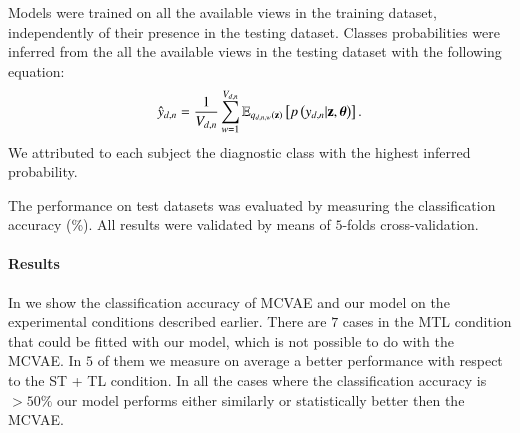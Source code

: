 Models were trained on all the available views in the training dataset, independently of their presence in the testing dataset.
Classes probabilities were inferred from the all the available views in the testing dataset with the following equation:
\begin{equation}\label{eq:reconstructiony}
\begin{aligned}
\hat{y}_{d,n} = \frac{1}{V_{d, n}} \sum_{w=1}^{V_{d, n}} \operatorname{\mathbb{E}}_{q_{d,n,w}(\mathbf{z})}\left[p\left(y_{d,n}|\mathbf{z},\boldsymbol{\theta}\right)\right].
\end{aligned}
\end{equation}
We attributed to each subject the diagnostic class with the highest inferred probability.

The performance on test datasets was evaluated by measuring the classification accuracy (\%).
All results were validated by means of $5$-folds cross-validation.

\paragraph{Results}
In  we show the classification accuracy of MCVAE and our model on the experimental conditions described earlier.
There are $7$ cases in the MTL condition that could be fitted with our model, which is not possible to do with the MCVAE.
In $5$ of them we measure on average a better performance with respect to the ST + TL condition.
In all the cases where the classification accuracy is $> 50\%$ our model performs either similarly or statistically better then the MCVAE.


